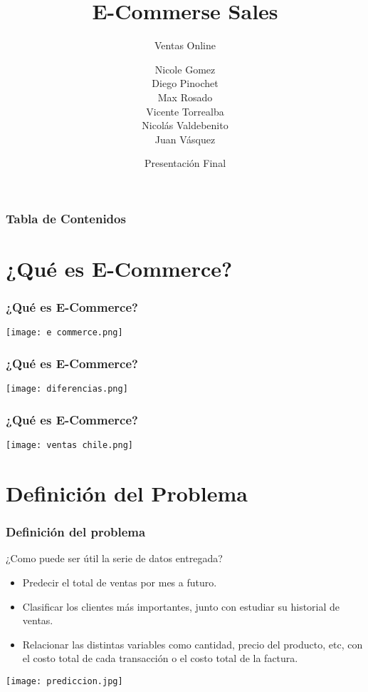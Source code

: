 \documentclass{beamer}
\title[E-Commerce Sales] %
{E-Commerse Sales}
\subtitle{Ventas Online}
\author[UTFSM] %
{ Nicole Gomez \\ Diego Pinochet \\ Max Rosado  \\ Vicente Torrealba \\ Nicolás Valdebenito \\ Juan Vásquez}
\institute[] %
{
Universidad Técnica Federico Santa María\\
  Departamento de Matemáticas (DMAT)

}
\date[1 de Diciembre de 2022] %
{Presentación Final}
\begin{document}
\frame{\titlepage}


\begin{frame}
\frametitle{Tabla de Contenidos}
\tableofcontents
\end{frame}
\section{¿Qué es E-Commerce?}
\begin{frame}
\frametitle{¿Qué es E-Commerce?}

\begin{center} 
    \texttt{[image: e commerce.png]}
\end{center}
\end{frame}

\begin{frame}
\frametitle{¿Qué es E-Commerce?}

\begin{center} 
    \texttt{[image: diferencias.png]}
\end{center}
\end{frame}
\begin{frame}
\frametitle{¿Qué es E-Commerce?}
\begin{center} 
    \texttt{[image: ventas chile.png]}
\end{center}
\end{frame}
\section{Definición del Problema}
\begin{frame}
\frametitle{Definición del problema}
\begin{block}{¿Como puede ser útil la serie de datos entregada?}
\begin{itemize}
    \item Predecir el total de ventas por mes a futuro.
    \item Clasificar los clientes más importantes, junto con estudiar su historial de ventas.
    \item Relacionar las distintas variables como cantidad, precio del producto, etc, con el costo total de cada transacción o el costo total de la factura.
\end{itemize}
\end{block}
\begin{center} 
    \texttt{[image: prediccion.jpg]}
\end{center}

\end{frame}
\end{document}
